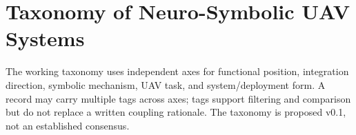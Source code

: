 \section{Taxonomy of Neuro-Symbolic UAV Systems}

The working taxonomy uses independent axes for functional position, integration
direction, symbolic mechanism, UAV task, and system/deployment form. A record
may carry multiple tags across axes; tags support filtering and comparison but
do not replace a written coupling rationale. The taxonomy is proposed v0.1,
not an established consensus.
